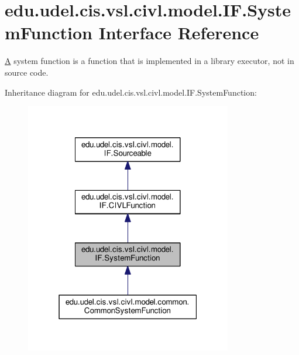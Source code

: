 \hypertarget{interfaceedu_1_1udel_1_1cis_1_1vsl_1_1civl_1_1model_1_1IF_1_1SystemFunction}{}\section{edu.\+udel.\+cis.\+vsl.\+civl.\+model.\+I\+F.\+System\+Function Interface Reference}
\label{interfaceedu_1_1udel_1_1cis_1_1vsl_1_1civl_1_1model_1_1IF_1_1SystemFunction}


\hyperlink{structA}{A} system function is a function that is implemented in a library executor, not in source code.  




Inheritance diagram for edu.\+udel.\+cis.\+vsl.\+civl.\+model.\+I\+F.\+System\+Function\+:
\nopagebreak
\begin{figure}[H]
\begin{center}
\leavevmode
\includegraphics[width=256pt]{interfaceedu_1_1udel_1_1cis_1_1vsl_1_1civl_1_1model_1_1IF_1_1SystemFunction__inherit__graph}
\end{center}
\end{figure}


